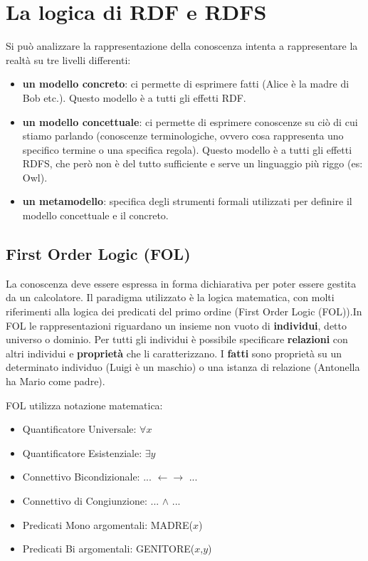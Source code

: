 \section{La logica di RDF e RDFS}
Si può analizzare la rappresentazione della conoscenza intenta a rappresentare la realtà su tre livelli differenti:
\begin{itemize}
	\item \textbf{un modello concreto}: ci permette di esprimere fatti (Alice è la madre di Bob etc.). Questo modello è a tutti gli effetti RDF. 
	\item \textbf{un modello concettuale}: ci permette di esprimere conoscenze su ciò di cui stiamo parlando (conoscenze terminologiche, ovvero cosa rappresenta uno specifico termine o una specifica regola). Questo modello è a tutti gli effetti RDFS, che però non è del tutto sufficiente e serve un linguaggio più riggo (es: Owl).
	\item \textbf{un metamodello}: specifica degli strumenti formali utilizzati per definire il modello concettuale e il concreto.
\end{itemize}

\subsection{First Order Logic (FOL)}
La conoscenza deve essere espressa in forma dichiarativa per poter essere gestita da un calcolatore. Il paradigma utilizzato è la logica matematica, con molti riferimenti alla logica dei predicati del primo ordine (First Order Logic (FOL)).\newline In FOL le rappresentazioni riguardano un insieme non vuoto di \textbf{individui}, detto universo o dominio. Per tutti gli individui è possibile specificare \textbf{relazioni} con altri individui e \textbf{proprietà} che li caratterizzano. I \textbf{fatti} sono proprietà su un determinato individuo (Luigi è un maschio) o una istanza di relazione (Antonella ha Mario come padre).

FOL utilizza notazione matematica:
\begin{itemize}
	\item Quantificatore Universale: $\forall x$
	\item Quantificatore Esistenziale: $\exists y$
	\item Connettivo Bicondizionale: ... $\leftarrow\rightarrow$ ...
	\item Connettivo di Congiunzione: ... $\land$ ...
	\item Predicati Mono
	argomentali: MADRE($x$)
	\item Predicati Bi
	argomentali: GENITORE($x$,$y$)
\end{itemize}

